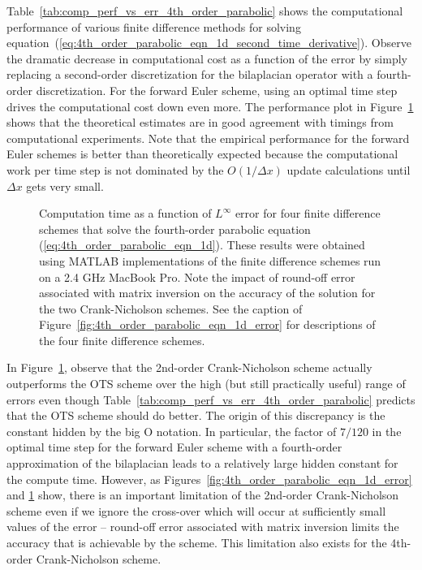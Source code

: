 \documentclass[fleqn,12pt,twoside]{article}
\def\dx{\Delta x}
\begin{document}
Table~\ref{tab:comp_perf_vs_err_4th_order_parabolic} shows the computational 
performance of various finite difference methods for solving 
equation~(\ref{eq:4th_order_parabolic_eqn_1d_second_time_derivative}).
Observe the dramatic decrease in computational cost as a function of the
error by simply replacing a second-order discretization for the bilaplacian 
operator with a fourth-order discretization.  For the forward Euler scheme,
using an optimal time step drives the computational cost down even more.
The performance plot in Figure~\ref{fig:4th_order_parabolic_eqn_1d_perf} 
shows that the theoretical estimates are in good agreement with timings 
from computational experiments.  Note that the empirical performance for the 
forward Euler schemes is better than theoretically expected because the 
computational work per time step is not dominated by the 
$O(1/\dx)$ update calculations until $\dx$ gets very small.

\begin{figure}[tb]
\begin{center}
\caption{Computation time as a function of $L^\infty$ error for four
finite difference schemes that solve the fourth-order parabolic equation
(\ref{eq:4th_order_parabolic_eqn_1d}).  
These results were obtained using MATLAB implementations of the 
finite difference schemes run on a 2.4 GHz MacBook Pro.
Note the impact of round-off error associated with matrix inversion on 
the accuracy of the solution for the two Crank-Nicholson schemes.
See the caption of Figure~\ref{fig:4th_order_parabolic_eqn_1d_error} for 
descriptions of the four finite difference schemes.
}
\label{fig:4th_order_parabolic_eqn_1d_perf}
\end{center}
\end{figure}

In Figure~\ref{fig:4th_order_parabolic_eqn_1d_perf}, observe that the 
2nd-order Crank-Nicholson scheme actually outperforms the OTS scheme over 
the high (but still practically useful) range of errors even though 
Table~\ref{tab:comp_perf_vs_err_4th_order_parabolic} predicts that the OTS
scheme should do better.  The origin of this discrepancy is the constant 
hidden by the big O notation.  In particular, the factor of $7/120$ in 
the optimal time step for the forward Euler scheme with a fourth-order 
approximation of the bilaplacian leads to a relatively large hidden constant 
for the compute time. 
However, as Figures~\ref{fig:4th_order_parabolic_eqn_1d_error} and
\ref{fig:4th_order_parabolic_eqn_1d_perf} show, there is an important 
limitation of the 2nd-order Crank-Nicholson scheme even if we ignore the 
cross-over which will occur at sufficiently small values of the error -- 
round-off error associated with matrix inversion limits the accuracy that is 
achievable by the scheme.  This limitation also exists for the 4th-order 
Crank-Nicholson scheme. 
\end{document}
